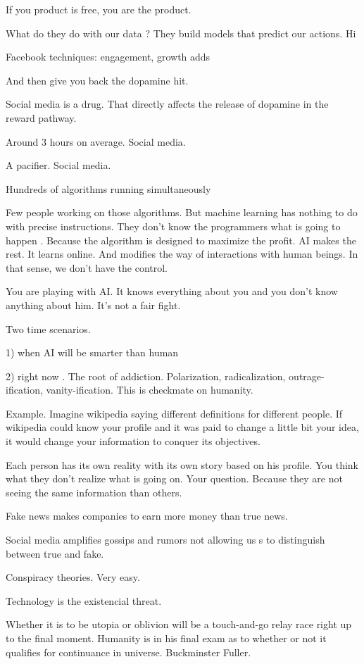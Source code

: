  If you  product is free, you are the product. 
 
 What do they do with our data ? 
 They build models that predict our actions. Hi
 
 Facebook techniques: engagement, growth adds
 
 And then give you back the dopamine hit. 
 
 Social media is a drug. That directly affects the release of dopamine in the reward pathway. 
 
 Around 3 hours on average. Social media. 
 
 A pacifier. Social media. 
 
 Hundreds of algorithms running simultaneously 
 
 Few people working on those algorithms. But machine learning has nothing to do with precise  instructions. They don't know the programmers 
 what is going to happen . Because the algorithm is designed to maximize the profit. AI makes the rest. It learns online. And modifies the 
 way of interactions with human beings. In that sense, we don't have the control. 
 
 You are playing with AI. It knows everything about you and you don't know anything about him.  It's not a fair fight. 
 
 Two time scenarios. 
 
 1) when AI will be smarter than human
 
 2) right now . The root of addiction.
  Polarization, radicalization, outrage-ification, vanity-ification. 
 This is checkmate on humanity. 
 
 Example. Imagine wikipedia saying different definitions for different people. If wikipedia could know your profile and it was paid to change 
 a little bit your idea, it would change your information to conquer its objectives. 
 
 Each person has its own reality with its own story based on his profile. 
 You think what they don't realize what is going on. Your question. Because they are not seeing the same information than others. 
 
 Fake news makes companies to earn more money than true news. 
 
 Social media amplifies gossips and rumors not allowing us s to distinguish between true and fake. 
 
 Conspiracy theories. Very easy. 
 
 Technology is the existencial threat. 
 
 Whether it is to be utopia or oblivion will be a touch-and-go relay race right up to the final moment. Humanity is in his final exam as to 
 whether or not it qualifies for continuance in universe. 
 Buckminster Fuller. 
 
